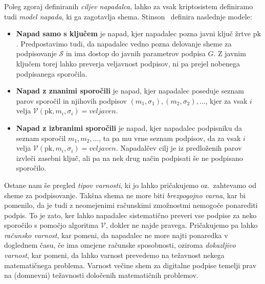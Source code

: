 Poleg zgoraj definiranih \textit{ciljev napadalca}, lahko za vsak kriptosistem definiramo tudi
\textit{model napada}, ki ga zagotavlja shema. Stinson~\cite{stinson2023crypto} definira naslednje
modele:
\begin{itemize}
    \item \textbf{Napad samo s ključem} je napad, kjer napadalec pozna javni ključ žrtve $\text{pk}$.
        Predpostavimo tudi, da napadalec vedno pozna delovanje sheme za podpisovanje $\mathcal{S}$
        in ima dostop do javnih parametrov podpisa $G$. Z javnim ključem torej lahko preverja
        veljavnost podpisov, ni pa prejel nobenega podpisanega sporočila.
    \item \textbf{Napad z znanimi sporočili} je napad, kjer napadalec poseduje seznam parov sporočil
        in njihovih podpisov $(m_1, \sigma_1), (m_2, \sigma_2), \dots$, kjer za vsak $i$ velja
        $\mathcal{V}(\text{pk}, m_i, \sigma_i) = veljaven$.
    \item \textbf{Napad z izbranimi sporočili} je napad, kjer napadalec podpisniku da seznam sporočil $m_1,
        m_2, \dots$, ta pa mu vrne seznam podpisov, da za vsak $i$ velja $\mathcal{V}(\text{pk}, m_i,
        \sigma_i) = veljaven$. Napadalčev cilj je iz predloženih parov izvleči zasebni ključ, ali pa
        na nek drug način podpisati še ne podpisano sporočilo.
\end{itemize}

Ostane nam še pregled \textit{tipov varnosti}, ki jo lahko pričakujemo oz.\ zahtevamo od sheme za
podpisovanje. Takšna shema ne more biti \textit{brezpogojno varna}, kar bi pomenilo, da je tudi z
neomejenimi računskimi zmožnostmi nemogoče ponarediti podpis. To je zato, ker lahko napadalec
sistematično preveri vse podpise za neko sporočilo s pomočjo algoritma $\mathcal{V}$, dokler ne najde
pravega. Pričakujemo pa lahko \textit{računsko varnost}, kar pomeni, da napadalec ne more najti
ponaredka v doglednem času, če ima omejene računske sposobnosti, oziroma \textit{dokazljivo varnost},
kar pomeni, da lahko varnost prevedemo na težavnost nekega matematičnega problema. Varnost večine
shem za digitalne podpise temelji prav na (domnevni) težavnosti določenih matematičnih problemov.

